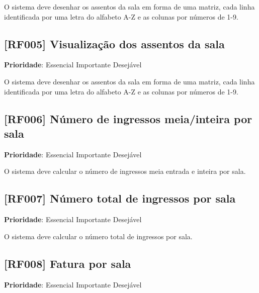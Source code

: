 \documentclass[12pt,a4paper]{article}
\begin{document}
O sistema deve desenhar os assentos da sala em forma de uma matriz, cada
linha identificada por uma letra do alfabeto A-Z e as colunas por números de
1-9.

\subsection{[RF005] Visualização dos assentos da sala}

\textbf{Prioridade}:
\mbox{\ooalign{$\checkmark$\cr\hidewidth$\square$\hidewidth\cr}} Essencial
\mbox{\ooalign{\cr\hidewidth$\square$\hidewidth\cr}} Importante
\mbox{\ooalign{\cr\hidewidth$\square$\hidewidth\cr}} Desejável

O sistema deve desenhar os assentos da sala em forma de uma matriz, cada
linha identificada por uma letra do alfabeto A-Z e as colunas por números de
1-9.

\subsection{[RF006] Número de ingressos meia/inteira por sala}

\textbf{Prioridade}:
\mbox{\ooalign{$\checkmark$\cr\hidewidth$\square$\hidewidth\cr}} Essencial
\mbox{\ooalign{\cr\hidewidth$\square$\hidewidth\cr}} Importante
\mbox{\ooalign{\cr\hidewidth$\square$\hidewidth\cr}} Desejável

O sistema deve calcular o número de ingressos meia entrada e inteira por sala.

\subsection{[RF007] Número total de ingressos por sala}

\textbf{Prioridade}:
\mbox{\ooalign{$\checkmark$\cr\hidewidth$\square$\hidewidth\cr}} Essencial
\mbox{\ooalign{\cr\hidewidth$\square$\hidewidth\cr}} Importante
\mbox{\ooalign{\cr\hidewidth$\square$\hidewidth\cr}} Desejável

O sistema deve calcular o número total de ingressos por sala.

\subsection{[RF008] Fatura por sala}

\textbf{Prioridade}:
\mbox{\ooalign{$\checkmark$\cr\hidewidth$\square$\hidewidth\cr}} Essencial
\mbox{\ooalign{\cr\hidewidth$\square$\hidewidth\cr}} Importante
\mbox{\ooalign{\cr\hidewidth$\square$\hidewidth\cr}} Desejável
\end{document}
